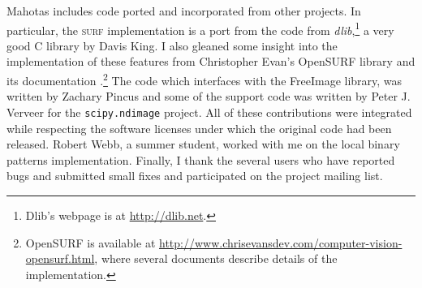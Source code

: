 \documentclass{article}
\newcommand*{\cpp}{{C\nolinebreak[4]\hspace{-.05em}\raisebox{.4ex}{\tiny\textbf{++}}}}
\let\code\texttt
\begin{document}
Mahotas includes code ported and incorporated from other projects. In
particular, the \textsc{surf} implementation is a port from the code from
\textit{dlib},\footnote{Dlib's webpage is at \url{http://dlib.net}.} a very
good \cpp{} library by Davis King. I also gleaned some insight into the
implementation of these features from Christopher Evan's OpenSURF library and
its documentation \citep{evans2009}.\footnote{OpenSURF is available at
\url{http://www.chrisevansdev.com/computer-vision-opensurf.html}, where several
documents describe details of the implementation.} The code which interfaces
with the FreeImage library, was written by Zachary Pincus and some of the
support code was written by Peter J. Verveer for the \code{scipy.ndimage}
project. All of these contributions were integrated while respecting the
software licenses under which the original code had been released. Robert Webb,
a summer student, worked with me on the local binary patterns implementation.
Finally, I thank the several users who have reported bugs and submitted small
fixes and participated on the project mailing list.

\printbibliography
\end{document}
